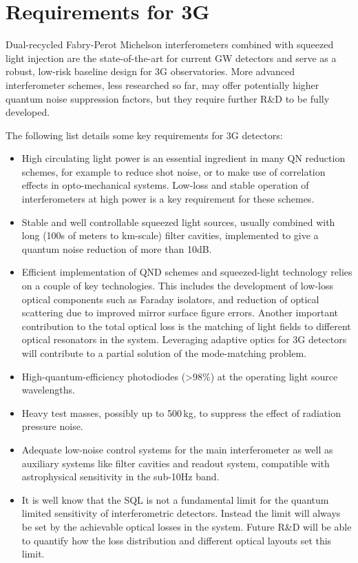 \section{Requirements for 3G}
Dual-recycled Fabry-Perot Michelson interferometers combined with squeezed light injection are the state-of-the-art for current GW detectors and serve as a robust, low-risk baseline design for 3G observatories.  More advanced interferometer schemes, less researched so far, may offer potentially higher quantum noise suppression factors, but they require further R\&D to be fully developed. 

The following list details some key requirements for 3G detectors:

\begin{itemize}
    \item High circulating light power is an essential ingredient in many QN reduction schemes, for example to reduce shot noise, or to make use of correlation effects in opto-mechanical systems. Low-loss and stable operation of interferometers at high power is a key requirement for these schemes.
\item Stable and well controllable squeezed light sources, usually combined with long (100s of meters to km-scale) filter cavities, implemented to give a quantum noise reduction of more than 10dB.
\item Efficient implementation of QND schemes and squeezed-light technology relies on a couple of key technologies. This includes the development of low-loss optical components such as Faraday isolators, and reduction of optical scattering due to improved mirror surface figure errors. Another important contribution to the total optical loss is the matching of light fields to different optical resonators in the system. Leveraging adaptive optics for 3G detectors will contribute to a partial solution of the mode-matching problem. 
\item High-quantum-efficiency photodiodes (>98\%) at the operating light source wavelengths.
\item Heavy test masses, possibly up to 500\,kg, to suppress the effect of radiation pressure noise.
\item Adequate low-noise control systems for the main interferometer as well as auxiliary systems like filter cavities and readout system, compatible with astrophysical sensitivity in the sub-10Hz band.   
\item It is well know that the SQL is not a fundamental limit for the quantum limited sensitivity of interferometric detectors. Instead the limit will always be set by the achievable optical losses in the system. Future R\&D will be able to quantify how the loss distribution and different optical layouts set this limit.
\end{itemize}

